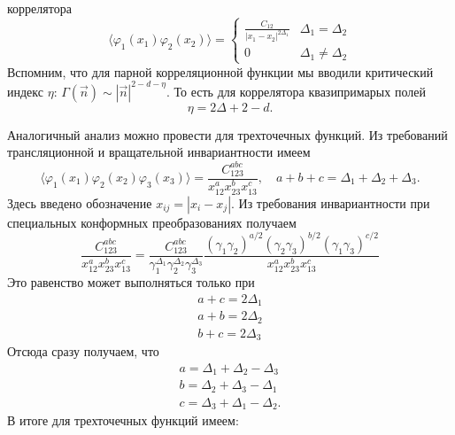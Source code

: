 \documentclass[a4paper,12pt]{article} \usepackage[utf8x]{inputenc} \usepackage[russian]{babel}
\theoremstyle{definition} \newtheorem{corollary}{Corollary}[theorem] \theoremstyle{definition}
\begin{document}
коррелятора
\begin{equation}
  \label{eq:190} \langle \varphi_{1}(x_{1}) \varphi_{2}(x_{2})\rangle =
   \begin{cases} \frac{C_{12}}{\left|x_{1}-x_{2}\right|^{2\Delta_{1}}} & \Delta_{1}=\Delta_{2}\\ 0 &
\Delta_{1}\neq \Delta_{2}
   \end{cases}
\end{equation} Вспомним, что для парной корреляционной функции мы вводили критический индекс $\eta$:
$\Gamma(\vec n)\sim |\vec n|^{2-d-\eta}$. То есть для коррелятора квазипримарых полей
\begin{equation}
  \label{eq:191} \eta=2\Delta +2 -d.
\end{equation}

Аналогичный анализ можно провести для трехточечных функций. Из требований трансляционной и
вращательной инвариантности имеем
\begin{equation}
  \label{eq:192} \langle
\varphi_{1}(x_{1})\varphi_{2}(x_{2})\varphi_{3}(x_{3})\rangle=\frac{C^{abc}_{123}}{x_{12}^{a}
x_{23}^{b}x_{13}^{c}},\quad a+b+c=\Delta_{1}+\Delta_{2}+\Delta_{3}.
\end{equation} Здесь введено обозначение $x_{ij}=|x_{i}-x_{j}|$. Из требования инвариантности при
специальных конформных преобразованиях получаем
\begin{equation}
  \label{eq:193} \frac{C^{abc}_{123}}{x_{12}^{a}
x_{23}^{b}x_{13}^{c}}=\frac{C^{abc}_{123}}{\gamma_{1}^{\Delta_{1}}\gamma_{2}^{\Delta_{2}}\gamma_{3}^{\Delta_{3}}}\frac{(\gamma_{1}\gamma_{2})^{a/2}(\gamma_{2}\gamma_{3})^{b/2}(\gamma_{1}\gamma_{3})^{c/2}}{x_{12}^{a}
x_{23}^{b}x_{13}^{c}}
\end{equation} Это равенство может выполняться только при
\begin{equation}
  \label{eq:194}
  \begin{array}{l} a+c=2\Delta_{1}\\ a+b=2\Delta_{2}\\ b+c=2\Delta_{3}
  \end{array}
\end{equation} Отсюда сразу получаем, что
\begin{equation}
  \label{eq:195}
  \begin{array}{l} a=\Delta_{1}+\Delta_{2}-\Delta_{3}\\ b=\Delta_{2}+\Delta_{3}-\Delta_{1}\\
c=\Delta_{3}+\Delta_{1}-\Delta_{2}.
  \end{array}
\end{equation} В итоге для трехточечных функций имеем:
\end{document}
